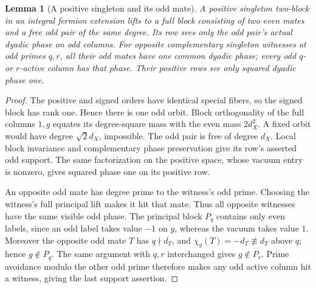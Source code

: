 \documentclass[11pt,a4paper]{article}
\numberwithin{equation}{section}
\newtheorem{lemma}[theorem]{Lemma}
\begin{document}
\begin{lemma}[A positive singleton and its odd mate]
\label{red:ef:singleton-mate}
A positive singleton two-block in an integral fermion extension
lifts to a full block consisting of two even mates and a free
odd pair of the same degree. Its row sees only the odd pair's
actual dyadic phase on odd columns.
For opposite complementary singleton witnesses at odd primes
$q,r$, all their odd mates have one common dyadic phase; every
odd $q$- or $r$-active column has that phase. Their positive
rows see only squared dyadic phase one.
\end{lemma}
\begin{proof}
The positive and signed orders have identical special fibers,
so the signed block has rank one. Hence there is one odd orbit.
Block orthogonality of the full columns $1,g$ equates its
degree-square mass with the even mass $2d_X^2$. A fixed orbit
would have degree $\sqrt2d_X$, impossible. The odd pair is
free of degree $d_X$. Local block invariance and complementary
phase preservation give its row's asserted odd support.
The same factorization on the positive space, whose vacuum
entry is nonzero, gives squared phase one on its positive row.

An opposite odd mate has degree prime to the witness's odd
prime. Choosing the witness's full principal lift makes it hit
that mate. Thus all opposite witnesses have the same visible
odd phase. The principal block $P_q$ contains only even labels,
since an odd label takes value $-1$ on $g$, whereas the vacuum
takes value $1$. Moreover the opposite odd mate $T$ has
$q\nmid d_T$, and $\chi_g(T)=-d_T\not\equiv d_T$
above $q$; hence $g\notin P_q$. The same argument with $q,r$
interchanged gives $g\notin P_r$. Prime avoidance modulo the other
odd prime therefore makes any odd active column hit a witness,
giving the last support assertion.
\end{proof}
\end{document}
